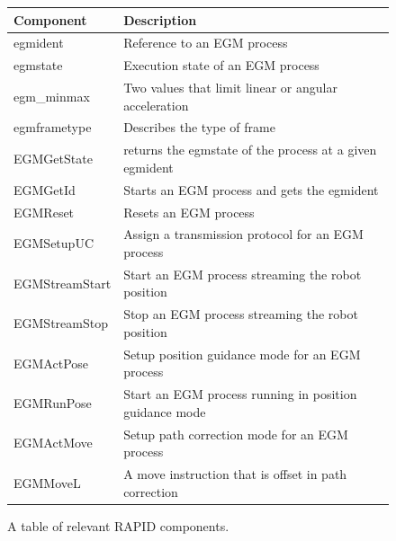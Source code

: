 \documentclass{cslthse-msc}
\begin{document}
\begin{figure}[H]
\vspace{0.25cm}
    \centering
    \footnotesize{
    \begin{tabular}{| l | p{8cm} |}
    \hline
    \textbf{Component} &  \textbf{Description} \\ 
    \hline
    egmident & Reference to an EGM process \cite[Sec. 3.25]{ABB:rapid_instructions}  \\ \hline
    egmstate & Execution state of an EGM process \cite[Sec. 3.27]{ABB:rapid_instructions} \\ \hline
    egm\_minmax & Two values that limit linear or angular acceleration \cite[Sec. 3.26]{ABB:rapid_instructions} \\ \hline
    egmframetype & Describes the type of frame \cite[Sec. 3.24]{ABB:rapid_instructions}\\ \hline
    EGMGetState &   returns the egmstate of the process at a given egmident \cite[Sec. 2.63]{ABB:rapid_instructions}\\ \hline
    EGMGetId & Starts an EGM process and gets the egmident \cite[Sec. 1.68]{ABB:rapid_instructions}\\ \hline
    EGMReset & Resets an EGM process \cite[Sec. 1.71]{ABB:rapid_instructions} \\ \hline
    EGMSetupUC    & Assign a transmission protocol for an EGM process \cite[Sec. 1.78]{ABB:rapid_instructions} \\ \hline
    EGMStreamStart  & Start an EGM process streaming the robot position \cite[Sec. 1.80]{ABB:rapid_instructions} \\ \hline
    EGMStreamStop  &  Stop an EGM process streaming the robot position \cite[Sec. 1.81]{ABB:rapid_instructions} \\ \hline
    EGMActPose    & Setup position guidance mode for an EGM process \cite[Sec. 1.67]{ABB:rapid_instructions} \\ \hline
    EGMRunPose    & Start an EGM process running in position guidance mode  \cite[Sec. 1.73]{ABB:rapid_instructions} \\ \hline
    EGMActMove   & Setup path correction mode for an EGM process \cite[Sec. 1.66]{ABB:rapid_instructions} \\ \hline
    EGMMoveL    & A move instruction that is offset in path correction \cite[Sec. 1.70]{ABB:rapid_instructions} \\ \hline
    \end{tabular}
    }
    \caption{A table of relevant RAPID components.}
    \label{fig:rapid_table}
\end{figure}
\end{document}
